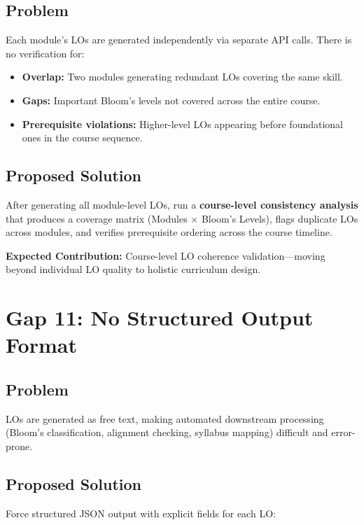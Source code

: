 \documentclass[11pt,a4paper]{article}
\begin{document}
\subsection{Problem}
Each module's LOs are generated independently via separate API calls. There is no verification for:
\begin{itemize}[nosep]
    \item \textbf{Overlap:} Two modules generating redundant LOs covering the same skill.
    \item \textbf{Gaps:} Important Bloom's levels not covered across the entire course.
    \item \textbf{Prerequisite violations:} Higher-level LOs appearing before foundational ones in the course sequence.
\end{itemize}

\subsection{Proposed Solution}
After generating all module-level LOs, run a \textbf{course-level consistency analysis} that produces a coverage matrix (Modules $\times$ Bloom's Levels), flags duplicate LOs across modules, and verifies prerequisite ordering across the course timeline.

\begin{notebox}
\textbf{Expected Contribution:} Course-level LO coherence validation---moving beyond individual LO quality to holistic curriculum design.
\end{notebox}

\section{Gap 11: No Structured Output Format}

\subsection{Problem}
LOs are generated as free text, making automated downstream processing (Bloom's classification, alignment checking, syllabus mapping) difficult and error-prone.

\subsection{Proposed Solution}
Force structured JSON output with explicit fields for each LO:
\end{document}
